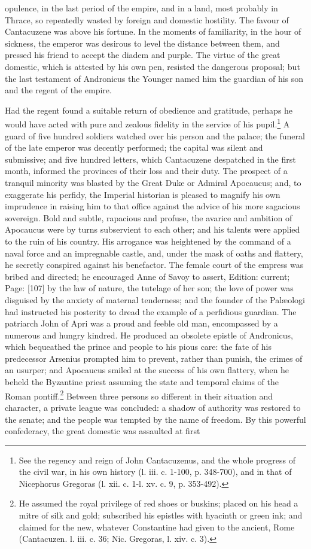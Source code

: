 opulence, in the last period of the empire, and in a land, most probably in Thrace, so repeatedly wasted by foreign and domestic hostility. The favour of Cantacuzene was above his fortune. In the moments of familiarity, in the hour of sickness, the emperor was desirous to level the distance between them, and pressed his friend to accept the diadem and purple. The virtue of the great domestic, which is attested by his own pen, resisted the dangerous proposal; but the last testament of Andronicus the Younger named him the guardian of his son and the regent of the empire.

Had the regent found a suitable return of obedience and gratitude, perhaps he would have acted with pure and zealous fidelity in the service of his pupil.\footnote{See the regency and reign of John Cantacuzenus, and the whole progress of the civil war, in his own history (l. iii. c. 1-100, p. 348-700), and in that of Nicephorus Gregoras (l. xii. c. 1-l. xv. c. 9, p. 353-492).} A guard of five hundred soldiers watched over his person and the palace; the funeral of the late emperor was decently performed; the capital was silent and submissive; and five hundred letters, which Cantacuzene despatched in the first month, informed the provinces of their loss and their duty. The prospect of a tranquil minority was blasted by the Great Duke or Admiral Apocaucus; and, to exaggerate his perfidy, the Imperial historian is pleased to magnify his own imprudence in raising him to that office against the advice of his more sagacious sovereign. Bold and subtle, rapacious and profuse, the avarice and ambition of Apocaucus were by turns subservient to each other; and his talents were applied to the ruin of his country. His arrogance was heightened by the command of a naval force and an impregnable castle, and, under the mask of oaths and flattery, he secretly conspired against his benefactor. The female court of the empress was bribed and directed; he encouraged Anne of Savoy to assert, Edition: current; Page: [107] by the law of nature, the tutelage of her son; the love of power was disguised by the anxiety of maternal tenderness; and the founder of the Palæologi had instructed his posterity to dread the example of a perfidious guardian. The patriarch John of Apri was a proud and feeble old man, encompassed by a numerous and hungry kindred. He produced an obsolete epistle of Andronicus, which bequeathed the prince and people to his pious care: the fate of his predecessor Arsenius prompted him to prevent, rather than punish, the crimes of an usurper; and Apocaucus smiled at the success of his own flattery, when he beheld the Byzantine priest assuming the state and temporal claims of the Roman pontiff.\footnote{He assumed the royal privilege of red shoes or buskins; placed on his head a mitre of silk and gold; subscribed his epistles with hyacinth or green ink; and claimed for the new, whatever Constantine had given to the ancient, Rome (Cantacuzen. l. iii. c. 36; Nic. Gregoras, l. xiv. c. 3).} Between three persons so different in their situation and character, a private league was concluded: a shadow of authority was restored to the senate; and the people was tempted by the name of freedom. By this powerful confederacy, the great domestic was assaulted at first 